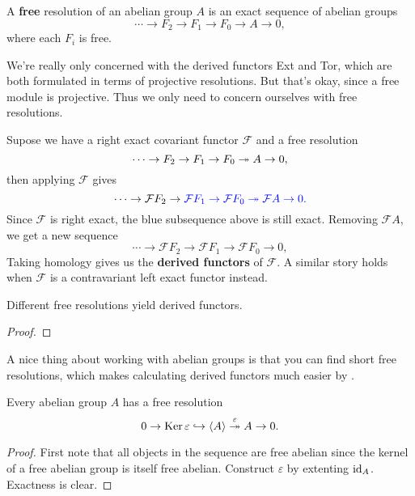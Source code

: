 \documentclass[twoside,10pt]{article}
\begin{document}
\begin{defn}[]
A \textbf{free} resolution of an abelian group $A$ is an exact sequence of abelian groups
\[
\cdots \to F_2\to F_1\to F_0\to A \to 0,
\] where each $F_{i}$ is free.
\end{defn}

\begin{note}[]
We're really only concerned with the derived functors Ext and Tor, which are both formulated in terms of projective resolutions. But that's okay, since a free module is projective. Thus we only need to concern ourselves with free resolutions.
\end{note}

Supose we have a right exact covariant functor $\mathcal{F}$ and a free resolution
\[
\cdots \to F_2\to F_1\to F_0\twoheadrightarrow A \to 0,
\] 
then applying $\mathcal{F}$ gives
\[
	\cdots \to \mathcal{F} F_2 \to {\color{blue}\mathcal{F}F_1 \to \mathcal{F}F_0 \twoheadrightarrow\mathcal{F}A \to 0.}
\] 
Since $\mathcal{F}$ is right exact, the blue subsequence above is still exact. Removing $\mathcal{F}A$, we get a new sequence
\[
\cdots \to \mathcal{F}F_2 \to \mathcal{F}F_1 \to \mathcal{F}F_0 \to 0,
\] 
Taking homology gives us the \textbf{derived functors} of $\mathcal{F}$. A similar story holds when $\mathcal{F}$ is a contravariant left exact functor instead. 

\begin{thrm}
	\label{diff-resolutions-same-derived}
	Different free resolutions yield  derived functors.
\end{thrm}
\begin{proof}
\end{proof}

\begin{note}
	A nice thing about working with abelian groups is that you can find short free resolutions, which makes calculating derived functors much easier by .
\end{note}

\begin{prop}
	Every abelian group $A$ has a free resolution
	\[
		0 \to \operatorname{Ker} \varepsilon \hookrightarrow \langle A \rangle \stackrel{\varepsilon}{\twoheadrightarrow} A \to 0.
	\] 
\end{prop}
\begin{proof}
	First note that all objects in the sequence are free abelian since the kernel of a free abelian group is itself free abelian. Construct $\varepsilon$ by extenting $\operatorname{id}_{A}$. Exactness is clear.
\end{proof}
\end{document}
